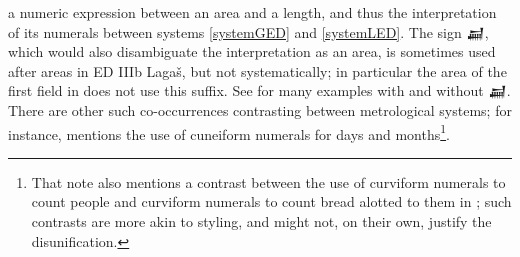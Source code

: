 \documentclass[10pt, a4paper, twoside]{article}
\newcommand{\withnote}{n.}
\begin{document}
a numeric expression between an area and a length,
and thus the interpretation of its
numerals between systems \ref{systemGED} and \ref{systemLED}.
The sign {\xsuxfont 𒃷},
which would also disambiguate the interpretation as an area,
is sometimes used after areas in ED IIIb Lagaš, but not systematically;
in particular the area of the first field in \cite{P020054} does not use this suffix.
See \cite{Lecompte2020} for many examples with and without {\xsuxfont 𒃷}.
There are other such co-occurrences contrasting between metrological systems;
for instance, \cite[\pno~303 \withnote~686]{Krebernik1998} mentions
the use of cuneiform numerals for days and months\footnote{That
note also mentions a contrast between the use of curviform numerals to count people
and curviform numerals to count bread alotted to them in \cite{P010876}; such contrasts are more akin
to styling, and might not, on their own, justify the disunification.}.
\end{document}
